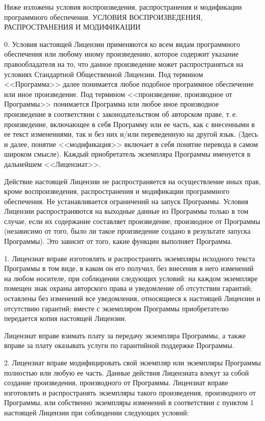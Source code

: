 \begin{small}
Ниже изложены условия воспроизведения, распространения и модификации
программного обеспечения.
УСЛОВИЯ ВОСПРОИЗВЕДЕНИЯ, РАСПРОСТРАНЕНИЯ И МОДИФИКАЦИИ

0. Условия настоящей Лицензии применяются ко всем видам программного
обеспечения или любому иному произведению, которое содержит указание
правообладателя на то, что данное произведение может распространяться на
условиях Стандартной Общественной Лицензии. Под термином <<Программа>>
далее понимается любое подобное программное обеспечение или иное
произведение. Под термином <<произведение, производное от Программы>>
понимается Программа или любое иное производное произведение в
соответствии с законодательством об авторском праве, т.\,е. произведение,
включающее в себя Программу или ее часть, как с внесенными в ее текст
изменениями, так и без них и/или переведенную на другой язык. (Здесь и
далее, понятие <<модификация>> включает в себя понятие перевода в самом
широком смысле). Каждый приобретатель экземпляра Программы именуется в
дальнейшем <<Лицензиат>>.

Действие настоящей Лицензии не распространяется на осуществление иных
прав, кроме воспроизведения, распространения и модификации программного
обеспечения. Не устанавливается ограничений на запуск Программы. Условия
Лицензии распространяются на выходные данные из Программы только в том
случае, если их содержание составляет произведение, производное от
Программы (независимо от того, было ли такое произведение создано в
результате запуска Программы). Это зависит от того, какие функции
выполняет Программа.

1. Лицензиат вправе изготовлять и распространять экземпляры исходного
текста Программы в том виде, в каком он его получил, без внесения в него
изменений на любом носителе, при соблюдении следующих условий: на каждом
экземпляре помещен знак охраны авторского права и уведомление об
отсутствии гарантий; оставлены без изменений все уведомления,
относящиеся к настоящей Лицензии и отсутствию гарантий; вместе с
экземпляром Программы приобретателю передается копия настоящей Лицензии.

Лицензиат вправе взимать плату за передачу экземпляра Программы, а также
вправе за плату оказывать услуги по гарантийной поддержке Программы.

2. Лицензиат вправе модифицировать свой экземпляр или экземпляры
Программы полностью или любую ее часть. Данные действия Лицензиата
влекут за собой создание произведения, производного от Программы.
Лицензиат вправе изготовлять и распространять экземпляры такого
произведения, производного от Программы, или собственно экземпляры
изменений в соответствии с пунктом 1 настоящей Лицензии при соблюдении
следующих условий:


\end{small}
